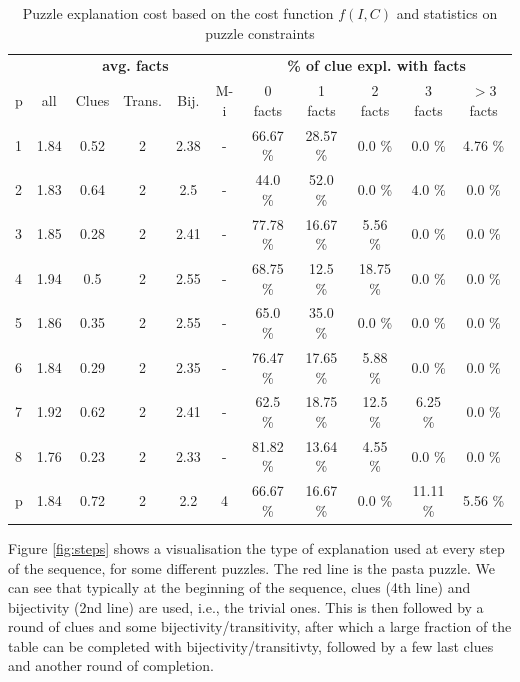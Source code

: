 \begin{table}
	\centering
\begin{tabular}{l|ccccc|ccccc}
    & \multicolumn{5}{c|}{\bf avg. facts} & \multicolumn{5}{c}{\bf \% of clue expl. with facts} \\
p & all & Clues & Trans. & Bij. & M-i & 0 facts & 1 facts & 2 facts & 3 facts &  $>$3 facts \\
\hline
1 &      1.84 &        0.52 &           2 &      2.38 &          - &      66.67 \% &      28.57 \% &        0.0 \% &        0.0 \% &         4.76 \% \\
2 &      1.83 &        0.64 &           2 &       2.5 &          - &       44.0 \% &       52.0 \% &        0.0 \% &        4.0 \% &          0.0 \% \\
3 &      1.85 &        0.28 &           2 &      2.41 &          - &      77.78 \% &      16.67 \% &       5.56 \% &        0.0 \% &          0.0 \% \\
4 &      1.94 &         0.5 &           2 &      2.55 &          - &      68.75 \% &       12.5 \% &      18.75 \% &        0.0 \% &          0.0 \% \\
5 &      1.86 &        0.35 &           2 &      2.55 &          - &       65.0 \% &       35.0 \% &        0.0 \% &        0.0 \% &          0.0 \% \\
6 &      1.84 &        0.29 &           2 &      2.35 &          - &      76.47 \% &      17.65 \% &       5.88 \% &        0.0 \% &          0.0 \% \\
7 &      1.92 &        0.62 &           2 &      2.41 &          - &       62.5 \% &      18.75 \% &       12.5 \% &       6.25 \% &          0.0 \% \\
8 &      1.76 &        0.23 &           2 &      2.33 &          - &      81.82 \% &      13.64 \% &       4.55 \% &        0.0 \% &          0.0 \% \\
p &      1.84 &        0.72 &           2 &       2.2 &          4 &      66.67 \% &      16.67 \% &        0.0 \% &      11.11 \% &         5.56 \% \\
\end{tabular}
\caption{Puzzle explanation cost based on the cost function $f(I, C)$ and statistics on puzzle constraints}
\label{table:sequence_leve}
\end{table}

 Figure \ref{fig:steps} shows a visualisation the type of explanation used at every step of the sequence, for some different puzzles. The red line is the pasta puzzle. We can see that typically at the beginning of the sequence, clues (4th line) and bijectivity (2nd line) are used, i.e., the trivial ones. This is then followed by a round of clues and some bijectivity/transitivity, after which a large fraction of the table can be completed with bijectivity/transitivty, followed by a few last clues and another round of completion.

